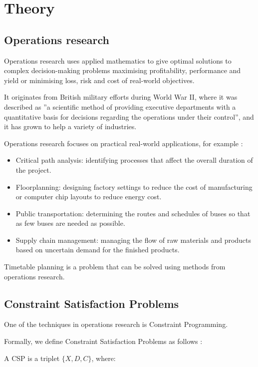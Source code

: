 \chapter{Theory}

\section{Operations research}

Operations research \cite{ORWiki} uses applied mathematics to give optimal solutions to complex decision-making problems maximising profitability, performance and yield or minimising loss, risk and cost of real-world objectives.

It originates from British military efforts during World War II, where it was described as ''a scientific method of providing executive departments with a quantitative basis for decisions regarding the operations under their control'', and it has grown to help a variety of industries. 

Operations research focuses on practical real-world applications, for example \cite{ORWiki}:

\begin{itemize}
\item Critical path analysis: identifying processes that affect the overall duration of the project.
\item Floorplanning: designing factory settings to reduce the cost of manufacturing or computer chip layouts to reduce energy cost.
\item Public transportation: determining the routes and schedules of buses so that as few buses are needed as possible.
\item Supply chain management: managing the flow of raw materials and products based on uncertain demand for the finished products.
\end{itemize}

Timetable planning is a problem that can be solved using methods from operations research.

\section{Constraint Satisfaction Problems}

One of the techniques in operations research is Constraint Programming.

Formally, we define Constraint Satisfaction Problems as follows \cite{CSPWiki}:

A CSP is a triplet $\{X,D,C\}$, where:

